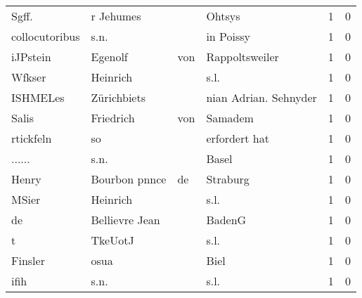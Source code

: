 \documentclass[10pt,a4paper,landscape]{article}
\begin{document}
\begin{longtable}{llllrr}
                    Sgff. &                          r Jehumes &             &                                      Ohtsys &          1 &         0 \\
           collocutoribus &                               s.n. &             &                                   in Poissy &          1 &         0 \\
                 iJPstein &                            Egenolf &         von &                              Rappoltsweiler &          1 &         0 \\
                   Wfkser &                           Heinrich &             &                                        s.l. &          1 &         0 \\
                 ISHMELes &                        Zürichbiets &             &                       nian Adrian. Sehnyder &          1 &         0 \\
                    Salis &                          Friedrich &         von &                                     Samadem &          1 &         0 \\
                rtickfeln &                                 so &             &                               erfordert hat &          1 &         0 \\
                   ...... &                               s.n. &             &                                       Basel &          1 &         0 \\
                    Henry &                      Bourbon pnnce &          de &                                    Straburg &          1 &         0 \\
                    MSier &                           Heinrich &             &                                        s.l. &          1 &         0 \\
                       de &                     Bellievre Jean &             &                                      BadenG &          1 &         0 \\
                        t &                            TkeUotJ &             &                                        s.l. &          1 &         0 \\
                  Finsler &                               osua &             &                                        Biel &          1 &         0 \\
                     ifih &                               s.n. &             &                                        s.l. &          1 &         0 \\

\end{longtable}
\end{document}
